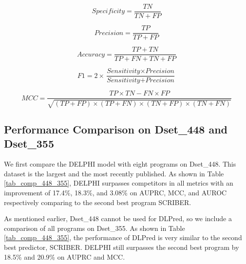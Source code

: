 \begin{equation}
\textit{Specificity} = \frac{TN}{TN+FP}
\end{equation}

\begin{equation}
\textit{Precision} = \frac{TP}{TP + FP} 
\end{equation}

\begin{equation}
\textit{Accuracy}=\frac{TP+TN}{TP+FN+TN+FP}
\end{equation}

\begin{equation}
F1=2\times \frac{\textit{Sensitivity}\times \textit{Precision}}{\textit{Sensitivity}+\textit{Precision}}
\end{equation}

\begin{equation}
MCC\!=\!\frac{TP \times TN - FN \times FP}{\sqrt{(TP\!+\!FP)\!\times\! (TP\!+\!FN)\! \times \!(TN\!+\!FP)\!\times\!(TN\!+\!FN)}}
\end{equation}
\subsection{Performance Comparison on Dset\_448 and Dset\_355}
We first compare the DELPHI model with eight programs on Dset\_448. This dataset is the largest and the most recently published. As shown in Table \ref{tab_comp_448_355}, DELPHI surpasses competitors in all metrics with an improvement of 17.4\%, 18.3\%, and 3.08\% on AUPRC, MCC, and AUROC respectively comparing to the second best program SCRIBER.

As mentioned earlier, Dset\_448 cannot be used for DLPred, so we include a comparison of all programs on Dset\_355. As shown in Table \ref{tab_comp_448_355}, the performance of DLPred is very similar to the second best predictor, SCRIBER.  DELPHI still surpasses the second best program by 18.5\% and 20.9\% on AUPRC and MCC.

